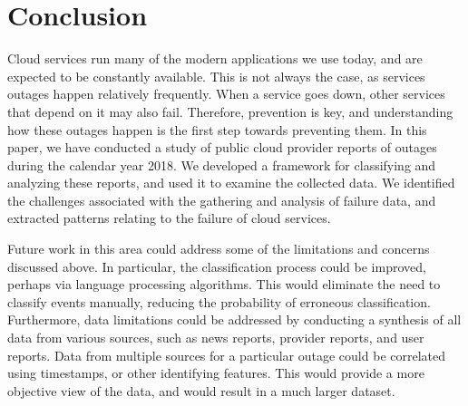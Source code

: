 \section{Conclusion}
Cloud services run many of the modern applications we use today, and are expected to be constantly available.
This is not always the case, as services outages happen relatively frequently.
When a service goes down, other services that depend on it may also fail.
Therefore, prevention is key, and understanding how these outages happen is the first step towards preventing them.
In this paper, we have conducted a study of public cloud provider reports of outages during the calendar year 2018.
We developed a framework for classifying and analyzing these reports, and used it to examine the collected data.
We identified the challenges associated with the gathering and analysis of failure data, and extracted patterns relating to the failure of cloud services.

Future work in this area could address some of the limitations and concerns discussed above.
In particular, the classification process could be improved, perhaps via language processing algorithms.
This would eliminate the need to classify events manually, reducing the probability of erroneous classification.
Furthermore, data limitations could be addressed by conducting a synthesis of all data from various sources, such as news reports, provider reports, and user reports.
Data from multiple sources for a particular outage could be correlated using timestamps, or other identifying features.
This would provide a more objective view of the data, and would result in a much larger dataset.
